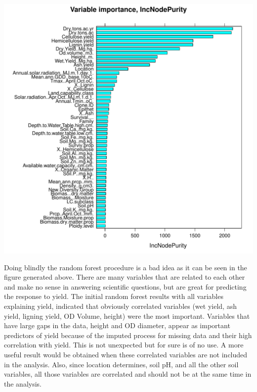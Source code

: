 \documentclass{article}\usepackage[]{graphicx}\usepackage[]{color}
\makeatletter
\def\maxwidth{ %
  \ifdim\Gin@nat@width>\linewidth
    \linewidth
  \else
    \Gin@nat@width
  \fi
}
\newenvironment{knitrout}{}{} %
\makeatother
\begin{document}
\begin{knitrout}
{}




{\centering \includegraphics[width=\maxwidth]{figure/BruteForceApproach-3} 

}



\end{knitrout}


Doing blindly the random forest procedure is a bad idea as it can be seen in the figure generated above. There are many variables that are related to each other and make no sense in answering scientific questions, but are great for predicting the response to yield. The initial random forest results with all variables explaining yield, indicated that obviously correlated variables (wet yield, ash yield, ligning yield, OD Volume, height) were the most important. Variables that have large gaps in the data, height and OD diameter, appear as important predictors of yield because of the imputed process for missing data and their high correlation with yield. This is not unexpected but for sure is of no use. A more useful result would be obtained when these correlated variables are not included in the analysis. Also, since location determines, soil  pH, and all the other soil variables, all those variables are correlated and should not be at the same time in the analysis.
\end{document}
